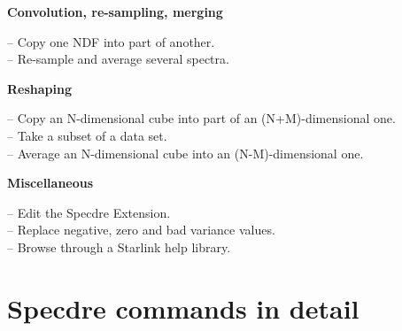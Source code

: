 {\bf Convolution, re-sampling, merging}

 -- Copy one NDF into part of another.\\
 -- Re-sample and average several spectra.

{\bf Reshaping}

 -- Copy an N-dimensional cube into part of an (N+M)-dimensional one.\\
 -- Take a subset of a data set.\\
 -- Average an N-dimensional cube into an (N-M)-dimensional one.

{\bf Miscellaneous}

 -- Edit the Specdre Extension.\\
 -- Replace negative, zero and bad variance values.\\
 -- Browse through a Starlink help library.


\newpage
\section{\label{applics}Specdre commands in detail}
\small








